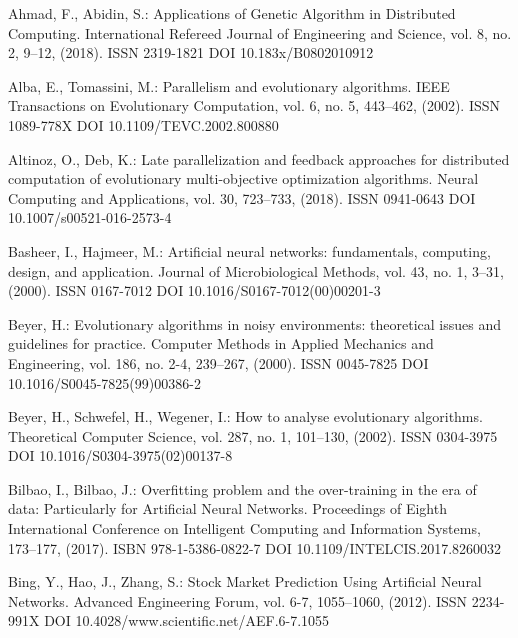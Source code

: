 
\begin{thebibliography}{99.}

 Ahmad, F., Abidin, S.: Applications of Genetic Algorithm in Distributed Computing. International Refereed Journal of Engineering and Science, vol. 8, no. 2, 9--12, (2018). ISSN 2319-1821 DOI 10.183x/B0802010912

 Alba, E., Tomassini, M.: Parallelism and evolutionary algorithms. IEEE Transactions on Evolutionary Computation, vol. 6, no. 5, 443--462, (2002). ISSN 1089-778X DOI 10.1109/TEVC.2002.800880

 Altinoz, O., Deb, K.: Late parallelization and feedback approaches for distributed computation of evolutionary multi-objective optimization algorithms. Neural Computing and Applications, vol. 30, 723--733, (2018). ISSN 0941-0643 DOI 10.1007/s00521-016-2573-4

 Basheer, I., Hajmeer, M.: Artificial neural networks: fundamentals, computing, design, and application. Journal of Microbiological Methods, vol. 43, no. 1, 3--31, (2000). ISSN 0167-7012 DOI 10.1016/S0167-7012(00)00201-3

 Beyer, H.: Evolutionary algorithms in noisy environments: theoretical issues and guidelines for practice. Computer Methods in Applied Mechanics and Engineering, vol. 186, no. 2-4, 239--267, (2000). ISSN 0045-7825 DOI 10.1016/S0045-7825(99)00386-2

 Beyer, H., Schwefel, H., Wegener, I.: How to analyse evolutionary algorithms. Theoretical Computer Science, vol. 287, no. 1, 101--130, (2002). ISSN 0304-3975 DOI 10.1016/S0304-3975(02)00137-8

 Bilbao, I., Bilbao, J.: Overfitting problem and the over-training in the era of data: Particularly for Artificial Neural Networks. Proceedings of Eighth International Conference on Intelligent Computing and Information Systems, 173--177, (2017). ISBN 978-1-5386-0822-7 DOI 10.1109/INTELCIS.2017.8260032

 Bing, Y., Hao, J., Zhang, S.: Stock Market Prediction Using Artificial Neural Networks. Advanced Engineering Forum, vol. 6-7, 1055--1060, (2012). ISSN 2234-991X DOI 10.4028/www.scientific.net/AEF.6-7.1055


\end{thebibliography}
